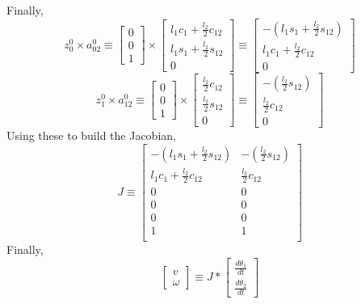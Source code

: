 \documentclass[12pt]{article}
\begin{document}
Finally,
\[
  z_0^0 \times a_{02}^0 \equiv
  \begin{bmatrix} 0 \\ 0 \\ 1 \end{bmatrix} \times
  \begin{bmatrix}
    l_1c_1 + \frac{l_2}{2}c_{12}\\
    l_1s_1 + \frac{l_2}{2}s_{12}\\
    0
  \end{bmatrix}
  \equiv
  \begin{bmatrix}
    -(l_1s_1 + \frac{l_2}{2}s_{12})\\
    l_1c_1 + \frac{l_2}{2}c_{12}\\
    0
  \end{bmatrix}
\]
\[
  z_1^0 \times a_{12}^0 \equiv
  \begin{bmatrix} 0 \\ 0 \\ 1 \end{bmatrix} \times
  \begin{bmatrix}
    \frac{l_2}{2}c_{12}\\
    \frac{l_2}{2}s_{12}\\
    0
  \end{bmatrix}
  \equiv
  \begin{bmatrix}
    -(\frac{l_2}{2}s_{12})\\
    \frac{l_2}{2}c_{12}\\
    0
  \end{bmatrix}
\]
Using these to build the Jacobian,
\[
  J \equiv
  \begin{bmatrix}
    -(l_1s_1 + \frac{l_2}{2}s_{12}) & -(\frac{l_2}{2}s_{12})\\
    l_1c_1 + \frac{l_2}{2}c_{12} & \frac{l_2}{2}c_{12}\\
    0 & 0 \\
    0 & 0 \\
    0 & 0 \\
    1 & 1 \\
  \end{bmatrix}
\]
Finally,
\[
  \begin{bmatrix} v \\ \omega \end{bmatrix}
  \equiv
  J *
  \begin{bmatrix} \frac{d\theta_1}{dt} \\ \frac{d\theta_2}{dt} \end{bmatrix}
\]
\end{document}
